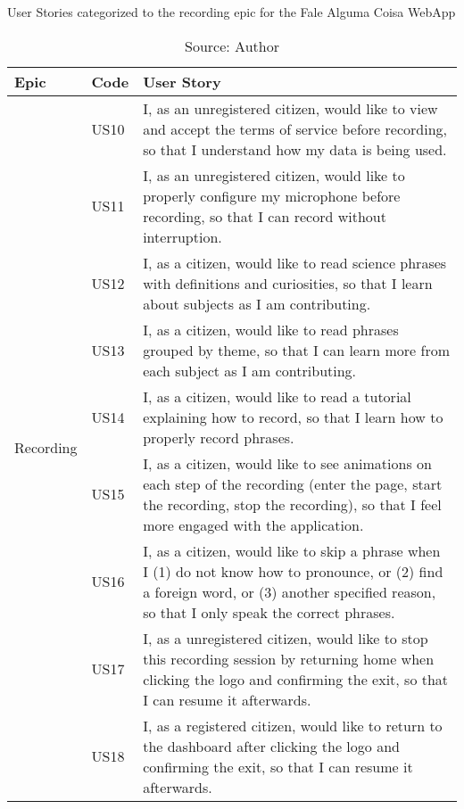 \begin{table}[h]
\caption{User Stories categorized to the recording epic for the Fale Alguma Coisa WebApp}
\label{tab:falealgumacoisa-recording-epic}
\centering
\begin{tabular}{|p{2cm}|p{1cm}|p{10cm}|}
\hline
Epic & Code & User Story \\ \hline
\multirow{9}{*}{Recording} 
    & US10 & I, as an unregistered citizen, would like to view and accept the terms of service before recording, so that I understand how my data is being used. \\ \cline{2-3} 
    & US11 & I, as an unregistered citizen, would like to properly configure my microphone before recording, so that I can record without interruption. \\ \cline{2-3} 
    & US12 & I, as a citizen, would like to read science phrases with definitions and curiosities, so that I learn about subjects as I am contributing. \\ \cline{2-3} 
    & US13 & I, as a citizen, would like to read phrases grouped by theme, so that I can learn more from each subject as I am contributing. \\ \cline{2-3} 
    & US14 & I, as a citizen, would like to read a tutorial explaining how to record, so that I learn how to properly record phrases. \\ \cline{2-3} 
    & US15 & I, as a citizen, would like to see animations on each step of the recording (enter the page, start the recording, stop the recording), so that I feel more engaged with the application. \\ \cline{2-3} 
    & US16 & I, as a citizen, would like to skip a phrase when I (1) do not know how to pronounce, or (2) find a foreign word, or (3) another specified reason, so that I only speak the correct phrases. \\ \cline{2-3} 
    & US17 & I, as a unregistered citizen, would like to stop this recording session by returning home when clicking the logo and confirming the exit, so that I can resume it afterwards. \\ \cline{2-3} 
    & US18 & I, as a registered citizen, would like to return to the dashboard after clicking the logo and confirming the exit, so that I can resume it afterwards. \\ \hline
\end{tabular}
\caption*{Source: Author}
\end{table}

